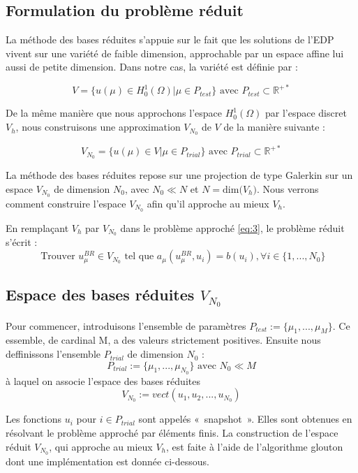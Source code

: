 \documentclass[12pt]{article}
\begin{document}
\subsection { Formulation du problème réduit }

\noindent La méthode des bases réduites s'appuie sur le fait que les solutions de l'EDP vivent sur une variété de faible dimension, approchable par un espace affine lui aussi de petite dimension. Dans notre cas, la variété est définie par :

$$ V =  \{ u(\mu) \in H^{1}_{0}(\Omega) | \mu \in P_{test} \} \text{ avec } P_{test} \subset \mathbb{R^{+*}}$$

\noindent De la même manière que nous approchons l’espace $H^{1}_{0}(\Omega)$ par l’espace discret $V_{h}$, nous construisons une approximation $V_{N_{0}}$ de $V$ de la manière suivante :

$$ V_{N_{0}} =  \{ u(\mu) \in  V | \mu \in P_{trial} \} \text{ avec } P_{trial} \subset \mathbb{R^{+*}}$$

\noindent La méthode des bases réduites repose sur une projection de type Galerkin sur un espace $V_{N_{0}}$ de dimension $N_{0}$, avec  $N_0\ll N $ et $N = \text{dim($V_{h}$)}$. Nous verrons comment construire l’espace $V_{N_{0}}$ afin qu’il approche au mieux $V_{h}$.

\noindent En remplaçant $V_{h}$ par $V_{N_{0}}$ dans le problème approché \eqref{eq:3}, le problème réduit s'écrit :
\begin{equation}
\label{eq:4}
 \text{ Trouver } u^{BR}_{\mu} \in V_{N_{0}} \text{ tel que } a_{\mu}(u^{BR}_{\mu},u_i) = b(u_i) , \forall i \in \{1,...,N_0\}   
\end{equation}



\subsection { Espace des bases réduites $V_{N_{0}}$ }

\noindent Pour commencer, introduisons l'ensemble de paramètres $P_{test}:= \{\mu_1,..., \mu_{M} \}$. Ce essemble, de cardinal M, a des valeurs strictement positives. Ensuite nous deffinissons l'ensemble $P_{trial}$ de dimension $N_{0}$ : 
$$P_{trial} := \{\mu_1,..., \mu_{N_0} \} \text{ avec } N_0\ll M$$ à laquel on associe l’espace des bases réduites 
$$ V_{N_{0}} := vect(u_1,u_2,..., u_{N_0}) $$

\noindent Les fonctions $u_i$ pour $ i \in P_{trial}$ sont appelés « snapshot ». Elles sont obtenues en résolvant le problème approché par éléments finis. La construction de l'espace réduit $V_{N_{0}}$, qui approche au mieux $V_{h}$, est faite à l’aide de l’algorithme glouton dont une implémentation est donnée ci-dessous.
\end{document}
